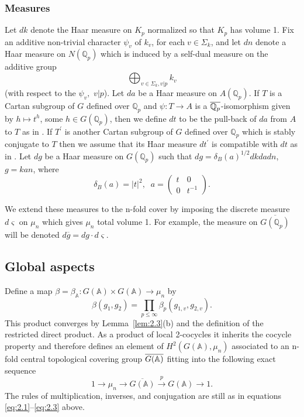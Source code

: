 \documentclass[12pt]{article}
\numberwithin{equation}{section}
\def\aaa{\mathbb{A}}
\def\qqq{\mathbb{Q}}
\begin{document}
\subsubsection{Measures}

Let $dk$ denote the Haar measure on $K_p$ normalized so that $K_p$ has
volume 1. Fix an additive non-trivial character $\psi _v$ of $k_v$, for each$%
\;v\in \Sigma _k$, and let $dn$ denote a Haar measure on $N(\qqq_p)$
which is induced by a self-dual measure on the additive group 
\[
\bigoplus_{v\in \Sigma _k, v|p}k_v
\]
(with respect to the $\psi _v,$ $v|p$).
Let $da$ be a Haar measure on $A(\qqq_p)$. If $T$ is a Cartan subgroup of 
$G$ defined over $\qqq_p$ and $\psi :T\rightarrow A$ is a $\overline{\mathbb{%
Q}_p}$-isomorphism given by $h\longmapsto t^h$, some $h\in G(\qqq_p)$,
then we define $dt$ to be the pull-back of $da$ from $A$ to $T$ as in \cite{R}.
If $T^{\prime }$ is another Cartan subgroup of $G$ defined over $\qqq_p$
which is stably conjugate to $T$ then we assume that its Haar measure
$dt^{\prime }$ is compatible with $dt$ as in \cite{R}. Let $dg$ be a Haar measure
on $G(\qqq_p)$ such that $dg=\delta _B(a)^{1/2}dkdadn$, $g=kan$, where 
\begin{equation}\label{eq:2.7}
\delta _B(a)=|t|^2,\;\;a=\left( 
\begin{array}{cc}
t & 0 \\ 
0 & t^{-1}
\end{array}
\right) .
\end{equation}

We extend these measures to the n-fold cover by imposing the discrete
measure $d\varsigma $ on $\mu _n$ which gives $\mu _n$ total volume 1. For
example, the measure on $\overline{G(\qqq_p)}$ will be denoted $d%
\overline{g}=dg\cdot d\varsigma $.

\subsection{Global aspects}\label{ssec:global}

Define a map $\beta =\beta _{\aaa }:G(\aaa )\times G(\aaa )\rightarrow
\mu _n$ by 
\[
\beta (g_1,g_2)=\prod_{p\leq \infty }\beta _p(g_{1,v},g_{2,v}).
\]
This product converges by Lemma~\ref{lem:2.3}(b) and the definition of the restricted
direct product. As a product of local 2-cocycles it inherits the cocycle
property and therefore defines an element of $H^2(G(\aaa ),\mu _n)$
associated to an n-fold central topological covering group $\overline{G(\mathbb{%
A})}$ fitting into the following exact sequence 
\begin{equation}\label{eq:2.8}
1\rightarrow \mu _n\rightarrow \overline{G(\aaa )}\stackrel{p}{\rightarrow 
}G(\aaa )\rightarrow 1.
\end{equation}
The rules of multiplication, inverses, and conjugation are still as in
equations \eqref{eq:2.1}--\eqref{eq:2.3} above.
\end{document}
